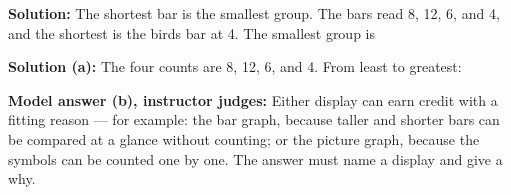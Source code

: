 \documentclass[12pt]{article}
\begin{document}
\textbf{Solution:} The shortest bar is the smallest group. The bars read
8, 12, 6, and 4, and the shortest is the birds bar at 4. The smallest group is


\textbf{Solution (a):} The four counts are 8, 12, 6, and 4. From least to
greatest: 

\textbf{Model answer (b), instructor judges:} Either display can earn credit
with a fitting reason --- for example: the bar graph, because taller and
shorter bars can be compared at a glance without counting; or the picture
graph, because the symbols can be counted one by one. The answer must name a
display and give a why.
\end{document}
